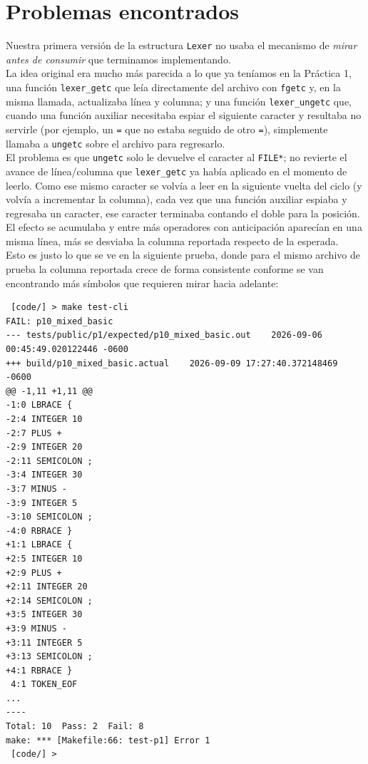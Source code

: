 \documentclass[12pt,letterpaper]{article}
\begin{document}
\newpage

\section*{Problemas encontrados}\label{sec:problemas}

Nuestra primera versión de la estructura \texttt{Lexer} no usaba el mecanismo de
\textit{mirar antes de consumir} que terminamos implementando.\\
La idea original era mucho más parecida a lo que ya teníamos en la Práctica 1, una función \texttt{lexer\_getc}
que leía directamente del archivo con \texttt{fgetc} y, en la misma llamada, actualizaba línea y columna; y una
función \texttt{lexer\_ungetc} que, cuando una función auxiliar necesitaba espiar el siguiente caracter y
resultaba no servirle (por ejemplo, un \texttt{=} que no estaba seguido de otro \texttt{=}), simplemente
llamaba a \texttt{ungetc} sobre el archivo para regresarlo.\\

El problema es que \texttt{ungetc} solo le devuelve el caracter al \texttt{FILE*}; no revierte el avance de
línea/columna que \texttt{lexer\_getc} ya había aplicado en el momento de leerlo. Como ese mismo caracter se
volvía a leer en la siguiente vuelta del ciclo (y volvía a incrementar la columna), cada vez que una función
auxiliar espiaba y regresaba un caracter, ese caracter terminaba contando el doble para la posición. El efecto
se acumulaba y entre más operadores con anticipación aparecían en una misma línea, más se desviaba la columna
reportada respecto de la esperada.\\

Esto es justo lo que se ve en la siguiente prueba, donde para el mismo archivo de prueba la columna reportada
crece de forma consistente conforme se van encontrando más símbolos que requieren mirar hacia adelante:

\begin{verbatim}
 [code/] > make test-cli
FAIL: p10_mixed_basic
--- tests/public/p1/expected/p10_mixed_basic.out	2026-09-06 00:45:49.020122446 -0600
+++ build/p10_mixed_basic.actual	2026-09-09 17:27:40.372148469 -0600
@@ -1,11 +1,11 @@
-1:0 LBRACE {
-2:4 INTEGER 10
-2:7 PLUS +
-2:9 INTEGER 20
-2:11 SEMICOLON ;
-3:4 INTEGER 30
-3:7 MINUS -
-3:9 INTEGER 5
-3:10 SEMICOLON ;
-4:0 RBRACE }
+1:1 LBRACE {
+2:5 INTEGER 10
+2:9 PLUS +
+2:11 INTEGER 20
+2:14 SEMICOLON ;
+3:5 INTEGER 30
+3:9 MINUS -
+3:11 INTEGER 5
+3:13 SEMICOLON ;
+4:1 RBRACE }
 4:1 TOKEN_EOF
...
----
Total: 10  Pass: 2  Fail: 8
make: *** [Makefile:66: test-p1] Error 1
 [code/] > 
\end{verbatim}
\end{document}
